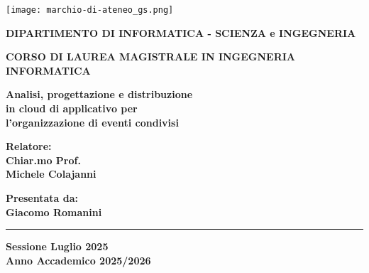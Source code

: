 
\begin{titlepage}
    
\pagestyle{empty}


\begin{center}

\texttt{[image: marchio-di-ateneo\_gs.png]}

\vspace{10mm}

{\normalsize{\bf{DIPARTIMENTO DI INFORMATICA - SCIENZA e INGEGNERIA}}} 

\vspace{5mm}

{\large{\bf{CORSO DI LAUREA MAGISTRALE IN INGEGNERIA INFORMATICA}}}
\end{center}
\vspace{23mm}
\begin{adjustwidth}{10mm}{10mm}
\begin{center}

{\Huge{\bf Analisi, progettazione e distribuzione}}\\
\vspace{3mm}
{\Huge{\bf in cloud di applicativo per}}\\
\vspace{3mm}
{\Huge{\bf l'organizzazione di eventi condivisi}}\\
\vspace{3mm}

\end{center}
\end{adjustwidth}

\vspace{35mm}

\begin{minipage}[t]{0.40\textwidth}
{\Large{\bf Relatore: \\ Chiar.mo Prof.\\ Michele Colajanni}}

\vspace{3mm}

{\Large{\bf }}
\end{minipage}
\hfill
\begin{minipage}[t]{0.40\textwidth}\raggedleft
{\Large{\bf Presentata da: \\ Giacomo Romanini}}
\end{minipage}

\vspace{10mm}

\rule[0.5cm]{15.8cm}{0.6mm}

\begin{center}
{\large{\bf Sessione Luglio 2025 \\}}
{\large{\bf Anno Accademico 2025/2026\\}}
\end{center}

\end{titlepage}

\restoregeometry
